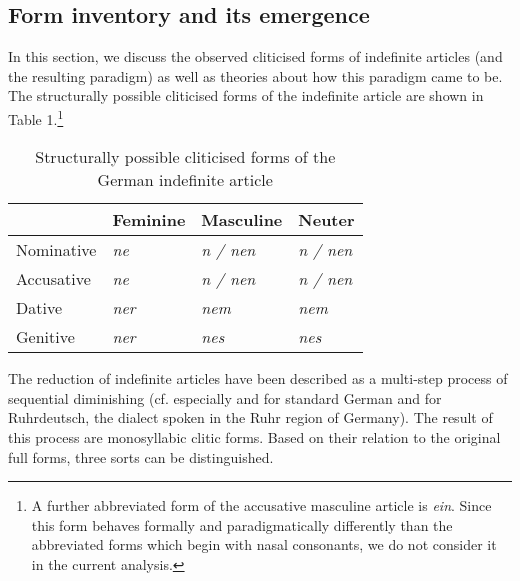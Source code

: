 \subsection{Form inventory and its emergence}
\label{subsec:12formInventory}

In this section, we discuss the observed cliticised forms of indefinite articles (and the resulting paradigm) as well as theories about how this paradigm came to be.
The structurally possible cliticised forms of the indefinite article are shown in Table 1.\footnote{
	A further abbreviated form of the accusative masculine article is \textit{ein}. Since this form behaves formally and paradigmatically differently than the abbreviated forms which begin with nasal consonants, we do not consider it in the current analysis.}

\begin{table}
	\centering
	\begin{tabular}{llll}
		\toprule
		\textbf{} & \textbf{Feminine} & \textbf{Masculine} & \textbf{Neuter} \\
		\midrule
		Nominative & \textit{ne} & \textit{n / nen} & \textit{n / nen} \\
		Accusative & \textit{ne} & \textit{n / nen} & \textit{n / nen} \\
		Dative & \textit{ner} & \textit{nem} & \textit{nem} \\
		Genitive & \textit{ner} & \textit{nes} & \textit{nes} \\
		\bottomrule
	\end{tabular}
	\caption{Structurally possible cliticised forms of the German indefinite article}
	\label{tab:0001}
\end{table}

The reduction of indefinite articles have been described as a multi-step process of sequential diminishing (cf. especially \citealt[46]{Dedenbach1987} and \citet[92]{Prinz1991} for standard German and \citealt{Schiering2002} for Ruhrdeutsch, the dialect spoken in the Ruhr region of Germany).
The result of this process are monosyllabic clitic forms.
Based on their relation to the original full forms, three sorts can be distinguished.

